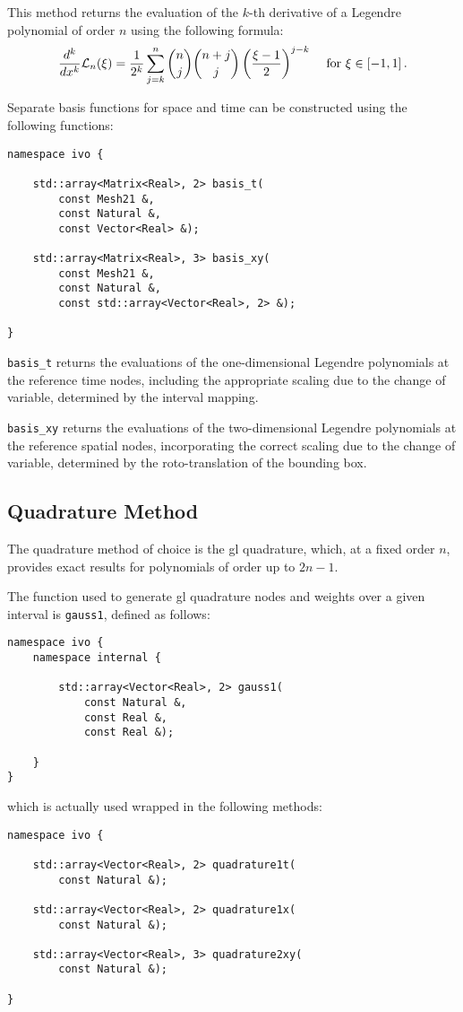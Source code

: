 This method returns the evaluation of the $k$-th derivative of a Legendre polynomial of order $n$ using the following formula:
\begin{align}
    \frac{d^k}{dx^k} \mathcal{L}_n(\xi) &= \frac{1}{2^k} \sum_{j = k}^{n} \binom{n}{j} \binom{n + j}{j} \left( \frac{\xi - 1}{2} \right)^{j - k} &\text{ for } \xi \in \left[ -1, 1 \right].
\end{align}

Separate basis functions for space and time can be constructed using the following functions:
\begin{lstlisting}[style=cpp]
namespace ivo {
    
    std::array<Matrix<Real>, 2> basis_t(
        const Mesh21 &, 
        const Natural &, 
        const Vector<Real> &);

    std::array<Matrix<Real>, 3> basis_xy(
        const Mesh21 &, 
        const Natural &, 
        const std::array<Vector<Real>, 2> &);

}
\end{lstlisting}

\lstinline{basis_t} returns the evaluations of the one-dimensional Legendre polynomials at the reference time nodes, including the appropriate scaling due to the change of variable, determined by the interval mapping.

\lstinline{basis_xy} returns the evaluations of the two-dimensional Legendre polynomials at the reference spatial nodes, incorporating the correct scaling due to the change of variable, determined by the roto-translation of the bounding box.

\newpage
\subsection{Quadrature Method} \label{subsection:quadrature}

The quadrature method of choice is the \acrfull{gl} quadrature, which, at a fixed order $n$, provides exact results for polynomials of order up to $2n - 1$.

The function used to generate \acrshort{gl} quadrature nodes and weights over a given interval is \lstinline{gauss1}, defined as follows:
\begin{lstlisting}[style=cpp]
namespace ivo {
    namespace internal {

        std::array<Vector<Real>, 2> gauss1(
            const Natural &, 
            const Real &, 
            const Real &);

    }
}
\end{lstlisting}
which is actually used wrapped in the following methods:
\begin{lstlisting}[style=cpp]
namespace ivo {

    std::array<Vector<Real>, 2> quadrature1t(
        const Natural &);

    std::array<Vector<Real>, 2> quadrature1x(
        const Natural &);

    std::array<Vector<Real>, 3> quadrature2xy(
        const Natural &);

}
\end{lstlisting}

